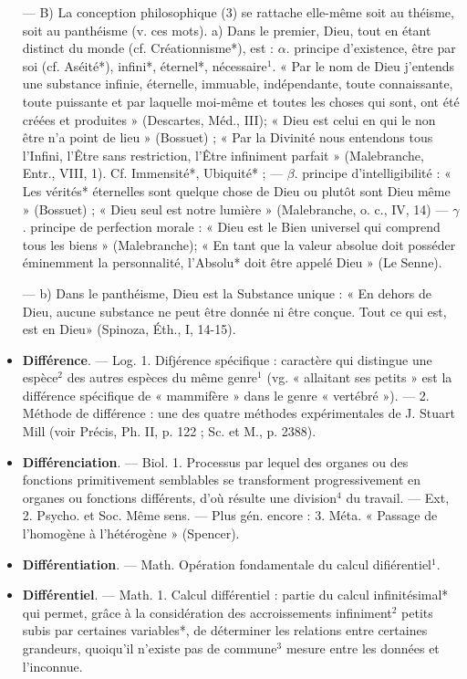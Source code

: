 \begin{itemize}[leftmargin=1cm, label=, itemsep=1pt]
— B) La conception philosophique (3) se rattache elle-même
soit au théisme, soit au panthéisme
(v. ces mots). a) Dans le premier,
Dieu, tout en étant distinct du
monde (cf. Créationnisme*), est :
$\alpha$. principe d'existence, être par soi
(cf. Aséité*), infini*, éternel*, nécessaire$^1$. « Par le nom de Dieu j’entends une substance infinie, éternelle, immuable, indépendante,
toute connaissante, toute puissante
et par laquelle moi-même et toutes
les choses qui sont, ont été créées et
produites » (Descartes, Méd., III);
« Dieu est celui en qui le non être
n’a point de lieu » (Bossuet) ; « Par
la Divinité nous entendons tous
l'Infini, l’Être sans restriction, l'Être
infiniment parfait » (Malebranche,
Entr., VIII, 1). Cf. Immensité*,
Ubiquité* ; — $\beta$. principe d'intelligibilité : « Les vérités* éternelles
sont quelque chose de Dieu ou
plutôt sont Dieu même » (Bossuet) ;
« Dieu seul est notre lumière » (Malebranche, o. c., IV, 14) — $\gamma$. principe
de perfection morale : « Dieu est le
Bien universel qui comprend tous
les biens » (Malebranche); « En tant
que la valeur absolue doit posséder
éminemment la personnalité, l’Absolu*
doit être appelé Dieu » (Le
Senne).

— b) Dans le panthéisme, Dieu
est la Substance unique : « En dehors
de Dieu, aucune substance ne peut
être donnée ni être conçue. Tout ce
qui est, est en Dieu» (Spinoza, Éth.,
I, 14-15).

\item {\bf Différence}. — Log. 1. Difjérence spécifique : caractère qui distingue une
espèce$^2$ des autres espèces du même
genre$^1$ (vg. « allaitant ses petits » est
la différence spécifique de « mammifère » dans le genre « vertébré »).
— 2. Méthode de différence : une
des quatre méthodes expérimentales
de J. Stuart Mill (voir Précis, Ph. II,
p. 122 ; Sc. et M., p. 2388).

\item {\bf Différenciation}. — Biol. 1. Processus par lequel des organes ou des
fonctions primitivement semblables
se transforment progressivement en
organes ou fonctions différents, d’où
résulte une division$^4$ du travail. —
Ext, 2. Psycho. et Soc. Même sens.
— Plus gén. encore : 3. Méta. « Passage de l’homogène à l’hétérogène »
(Spencer).

\item {\bf Différentiation}. — Math. Opération
fondamentale du calcul difiérentiel$^1$.

\item {\bf Différentiel}. — Math. 1. Calcul différentiel : partie du calcul infinitésimal* qui permet, grâce à la considération des accroissements infiniment$^2$ petits subis par certaines
variables*, de déterminer les relations entre certaines grandeurs,
quoiqu'il n'existe pas de commune$^3$
mesure entre les données et l’inconnue.


\end{itemize}
